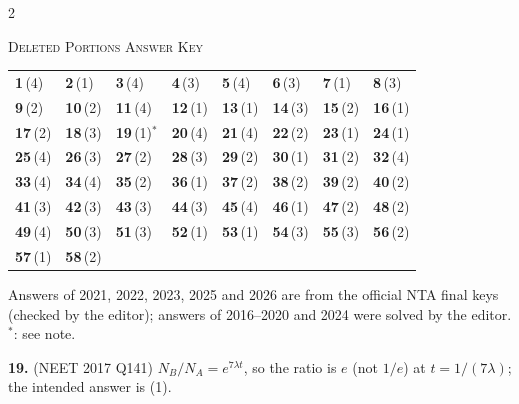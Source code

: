 \begin{multicols}{2}
{}
\end{multicols}
\par{}\vspace{12pt}
\begin{center}{}\par
{\large\color{navy}\scshape Deleted Portions \textperiodcentered{} Answer Key}\end{center}
{\small\setlength{\tabcolsep}{1pt}\renewcommand{\arraystretch}{1.5}
\begin{tabularx}{\linewidth}{@{}*{8}{>{\centering\arraybackslash}X}@{}}\toprule
\textbf{1}\,(4) & \textbf{2}\,(1) & \textbf{3}\,(4) & \textbf{4}\,(3) & \textbf{5}\,(4) & \textbf{6}\,(3) & \textbf{7}\,(1) & \textbf{8}\,(3)\\
\textbf{9}\,(2) & \textbf{10}\,(2) & \textbf{11}\,(4) & \textbf{12}\,(1) & \textbf{13}\,(1) & \textbf{14}\,(3) & \textbf{15}\,(2) & \textbf{16}\,(1)\\
\textbf{17}\,(2) & \textbf{18}\,(3) & \textbf{19}\,(1)$^{*}$ & \textbf{20}\,(4) & \textbf{21}\,(4) & \textbf{22}\,(2) & \textbf{23}\,(1) & \textbf{24}\,(1)\\
\textbf{25}\,(4) & \textbf{26}\,(3) & \textbf{27}\,(2) & \textbf{28}\,(3) & \textbf{29}\,(2) & \textbf{30}\,(1) & \textbf{31}\,(2) & \textbf{32}\,(4)\\
\textbf{33}\,(4) & \textbf{34}\,(4) & \textbf{35}\,(2) & \textbf{36}\,(1) & \textbf{37}\,(2) & \textbf{38}\,(2) & \textbf{39}\,(2) & \textbf{40}\,(2)\\
\textbf{41}\,(3) & \textbf{42}\,(3) & \textbf{43}\,(3) & \textbf{44}\,(3) & \textbf{45}\,(4) & \textbf{46}\,(1) & \textbf{47}\,(2) & \textbf{48}\,(2)\\
\textbf{49}\,(4) & \textbf{50}\,(3) & \textbf{51}\,(3) & \textbf{52}\,(1) & \textbf{53}\,(1) & \textbf{54}\,(3) & \textbf{55}\,(3) & \textbf{56}\,(2)\\
\textbf{57}\,(1) & \textbf{58}\,(2) &  &  &  &  &  & \\\bottomrule\end{tabularx}}\par\smallskip
{\footnotesize Answers of 2021, 2022, 2023, 2025 and 2026 are from the official NTA final keys (checked by the editor); answers of 2016--2020 and 2024 were solved by the editor. $^{*}$: see note.
\par\smallskip\textbf{19.} (NEET 2017 Q141) $N_B/N_A=e^{7\lambda t}$, so the ratio is $e$ (not $1/e$) at $t=1/(7\lambda)$; the intended answer is (1).
}\par
